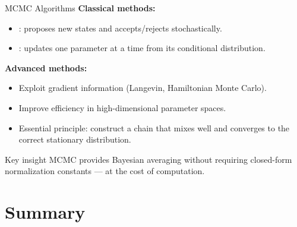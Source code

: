 \begin{frame}{MCMC Algorithms}
  \textbf{Classical methods:}
  \begin{itemize}
    \item {}: proposes new states and accepts/rejects stochastically.
    \item {}: updates one parameter at a time from its conditional distribution.
  \end{itemize}
  \vspace{0.3cm}
  \textbf{Advanced methods:}
  \begin{itemize}
    \item Exploit gradient information (Langevin, Hamiltonian Monte Carlo).
    \item Improve efficiency in high-dimensional parameter spaces.
    \item Essential principle: construct a chain that mixes well and converges to the correct stationary distribution.
  \end{itemize}
  \vspace{0.2cm}
  \begin{block}{Key insight}
    MCMC provides Bayesian averaging without requiring closed-form normalization constants — at the cost of computation.
  \end{block}
\end{frame}

\section{Summary}

